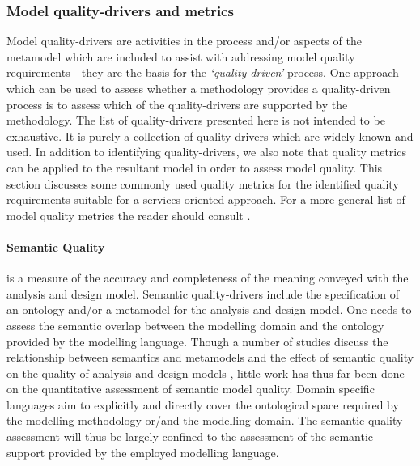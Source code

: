 
\subsubsection{Model quality-drivers and metrics}
\label{sec:modelQualityDriversAndMetrics}

Model quality-drivers are activities in the process and/or aspects of the metamodel which are included to assist with addressing model quality requirements - they are the basis for the \emph{`quality-driven'} process. One approach which can be used to assess whether a methodology provides a quality-driven process is to assess which of the quality-drivers are supported by the methodology. The list of quality-drivers presented here is not intended to be exhaustive. It is purely a collection of quality-drivers which are widely known and used. In addition to identifying quality-drivers, we also note that quality metrics can be applied to the resultant model in order to assess model quality. This section discusses some commonly used quality metrics for the identified quality requirements suitable for a services-oriented approach. For a more general list of model quality metrics the reader should consult \cite{mohagheghi_existing_2009}.

\paragraph{Semantic Quality} is a measure of the accuracy and completeness of the meaning conveyed with the analysis and design model. Semantic quality-drivers include the specification of an ontology and/or a metamodel for the analysis and design model. One needs to assess the semantic overlap between the modelling domain and the ontology provided by the modelling language. Though a number of studies discuss the relationship between semantics and metamodels \cite{staab_model_2010,veldhuis_tool_2009,henderson-sellers_bridging_2011} and the effect of semantic quality on the quality of analysis and design models \cite{buder_effects_2010,staab_model_2010}, little work has thus far been done on the quantitative assessment of semantic model quality. Domain specific languages aim to explicitly and directly cover the ontological space required by the modelling methodology or/and the modelling domain. The semantic quality assessment will thus be largely confined to the assessment of the semantic support provided by the employed modelling language.

